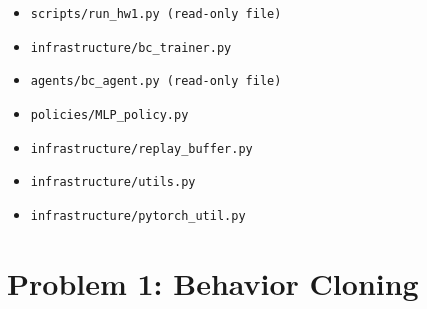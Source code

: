 \documentclass[12pt]{article}
\begin{document}
\begin{itemize}
\item \texttt{scripts/run\_hw1.py (read-only file)}
\item \texttt{infrastructure/bc\_trainer.py}
\item \texttt{agents/bc\_agent.py (read-only file)}
\item \texttt{policies/MLP\_policy.py}
\item \texttt{infrastructure/replay\_buffer.py}
\item \texttt{infrastructure/utils.py}
\item \texttt{infrastructure/pytorch\_util.py}
\end{itemize}

\newpage
\section*{Problem 1: Behavior Cloning}
\end{document}
